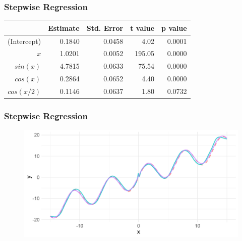 \documentclass[aspectratio=169]{beamer}
\begin{document}
\begin{frame}
	\frametitle{Stepwise Regression}
	\begin{table}
		\centering
		\begin{tabular}{rrrrr}
			\hline
			             & Estimate & Std. Error & t value & p value \\
			\hline
			(Intercept)  & 0.1840   & 0.0458     & 4.02    & 0.0001         \\
			\(x\)        & 1.0201   & 0.0052     & 195.05  & 0.0000         \\
			\(sin(x)\)   & 4.7815   & 0.0633     & 75.54   & 0.0000         \\
			\(cos(x)\)   & 0.2864   & 0.0652     & 4.40    & 0.0000         \\
			\(cos(x/2)\) & 0.1146   & 0.0637     & 1.80    & 0.0732         \\
			\hline
		\end{tabular}
	\end{table}
\end{frame}

\begin{frame}
	\frametitle{Stepwise Regression}
	\begin{figure}
		\includegraphics[width=0.9\linewidth]{stepwise-fit.pdf}
	\end{figure}
\end{frame}
\end{document}

